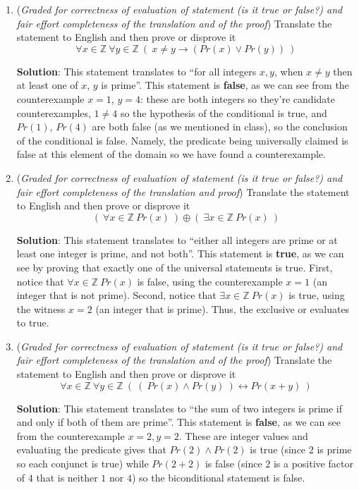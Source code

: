 \begin{enumerate}
\begin{enumerate}
   \item ({\it Graded for correctness of evaluation of statement (is it true or false?)
   and fair effort completeness of the translation and of the proof}) 
    Translate the statement to English and then prove or disprove it
   $$\forall x \in \mathbb{Z}~ \forall y \in \mathbb{Z}~(~x \neq y \to (Pr(x) \lor Pr(y))~)$$

   {\bf Solution}: This statement translates to ``for all integers $x,y$, when $x \neq y$ then 
   at least one of $x$, $y$ is prime''. This statement is {\bf false}, as we can see 
   from the counterexample $x = 1$, $y=4$: these are both integers so they're candidate
   counterexamples, $1 \neq 4$ so the hypothesis of the conditional is true, and
   $Pr(1)$, $Pr(4)$ are both false (as we mentioned in class), so the conclusion of the 
   conditional is false. Namely, the predicate being universally claimed is false at this element 
   of the domain so we have found a counterexample.

   \item ({\it Graded for correctness of evaluation of statement (is it true or false?) 
   and fair effort completeness of the translation and proof}) 
   Translate the statement to English and then prove or disprove it
   $$\left( ~\forall x \in \mathbb{Z} ~Pr(x)~\right) \oplus \left(~\exists x \in \mathbb{Z} ~Pr(x) ~\right)$$

   {\bf Solution}: This statement translates to ``either all integers are prime 
   or at least one integer is prime, and not both''. This statement is {\bf true}, as we can see 
   by proving that exactly one of the universal statements is true. First, notice that 
   $\forall x \in \mathbb{Z} ~Pr(x)$ is false, using the counterexample $x = 1$ (an integer that is not prime).
   Second, notice that $\exists x \in \mathbb{Z} ~Pr(x)$ is true, using the witness $x = 2$ (an integer that is prime).
   Thus, the exclusive or evaluates to true.

   \item ({\it Graded for correctness of evaluation of statement (is it true or false?) 
   and fair effort completeness of the translation and of the proof}) 
    Translate the statement to English and then prove or disprove it
   $$\forall x \in \mathbb{Z}~ \forall y \in \mathbb{Z}~(~(~Pr(x) \land Pr(y)~) \leftrightarrow Pr(x+y)~)$$

   {\bf Solution}: This statement translates to ``the sum of two integers is prime if and only if
   both of them are prime''. This statement is {\bf false}, as we can see 
   from the counterexample $x = 2, y = 2$. These are integer values and evaluating the 
   predicate gives that $Pr(2) \land Pr(2)$ is true (since $2$ is prime so each conjunct is true) while
   $Pr(2+2)$ is false (since $2$ is a positive factor of $4$ that is neither $1$ nor $4$) so the 
   biconditional statement is false.
   


\end{enumerate}
\end{enumerate}
